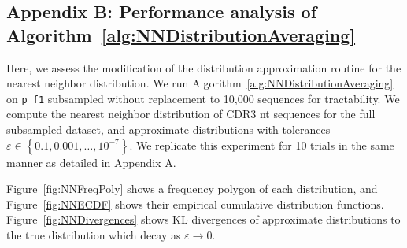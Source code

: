\documentclass{article}
\begin{document}
\subsection*{Appendix B: Performance analysis of Algorithm~\ref{alg:NNDistributionAveraging}}
Here, we assess the modification of the distribution approximation routine for the nearest neighbor distribution.
We run Algorithm~\ref{alg:NNDistributionAveraging} on \texttt{p\_f1} subsampled without replacement to 10,000 sequences for tractability.
We compute the nearest neighbor distribution of CDR3 nt sequences for the full subsampled dataset, and approximate distributions with tolerances $\varepsilon \in \left\{0.1, 0.001, \dotsc, 10^{-7} \right\}$.
We replicate this experiment for 10 trials in the same manner as detailed in Appendix A.

Figure~\ref{fig:NNFreqPoly} shows a frequency polygon of each distribution, and Figure~\ref{fig:NNECDF} shows their empirical cumulative distribution functions.
Figure~\ref{fig:NNDivergences} shows KL divergences of approximate distributions to the true distribution which decay as $\varepsilon \to 0$.
\end{document}
